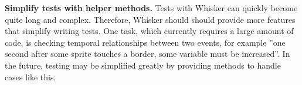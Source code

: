 \textbf{Simplify tests with helper methods.}
Tests with Whisker can quickly become quite long and complex.
Therefore, Whisker should should provide more features that simplify writing tests.
One task, which currently requires a large amount of code,
is checking temporal relationships between two events,
for example ''one second after some sprite touches a border, some variable must be increased''.
In the future, testing may be simplified greatly by providing methods to handle cases like this.
\parspace


